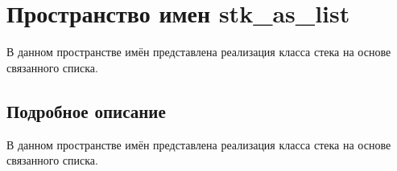 \hypertarget{namespacestk__as__list}{}\section{Пространство имен stk\+\_\+as\+\_\+list}
\label{namespacestk__as__list}


В данном пространстве имён представлена реализация класса стека на основе связанного списка.  




\subsection{Подробное описание}
В данном пространстве имён представлена реализация класса стека на основе связанного списка. 